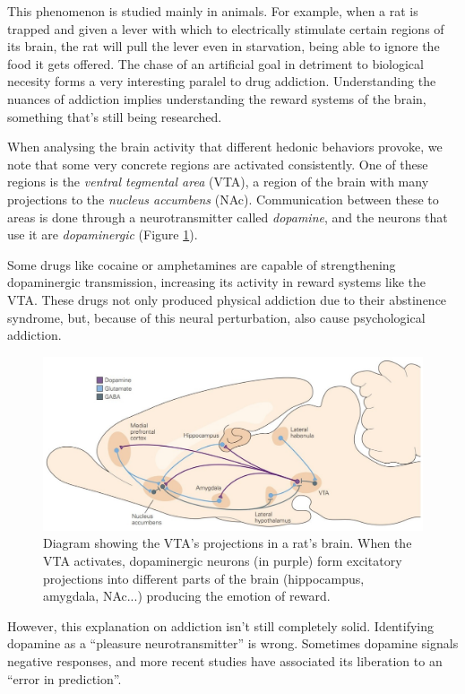 This phenomenon is studied mainly in animals. For example, when a rat is trapped and given a lever with which to electrically stimulate certain regions of its brain, the rat will pull the lever even in starvation, being able to ignore the food it gets offered. The chase of an artificial goal in detriment to biological necesity forms a very interesting paralel to drug addiction. Understanding the nuances of addiction implies understanding the reward systems of the brain, something that's still being researched.

When analysing the brain activity that different hedonic behaviors provoke, we note that some very concrete regions are activated consistently. One of these regions is the \textit{ventral tegmental area} (VTA), a region of the brain with many projections to the \textit{nucleus accumbens} (NAc). Communication between these to areas is done through a neurotransmitter called \textit{dopamine}, and the neurons that use it are \textit{dopaminergic} (Figure \ref{ratbrain}).

Some drugs like cocaine or amphetamines are capable of strengthening dopaminergic transmission, increasing its activity in reward systems like the VTA. These drugs not only produced physical addiction due to their abstinence syndrome, but, because of this neural perturbation, also cause psychological addiction.

\begin{figure}[H]
	\centering
	\includegraphics[width=\linewidth]{media/8-ratbrain.png}
	\caption{Diagram showing the VTA's projections in a rat's brain. When the VTA activates, dopaminergic neurons (in purple) form excitatory projections into different parts of the brain (hippocampus, amygdala, NAc...) producing the emotion of reward.}
	\label{ratbrain}
\end{figure}

However, this explanation on addiction isn't still completely solid. Identifying dopamine as a \enquote{pleasure neurotransmitter} is wrong. Sometimes dopamine signals negative responses, and more recent studies have associated its liberation to an \enquote{error in prediction}.

